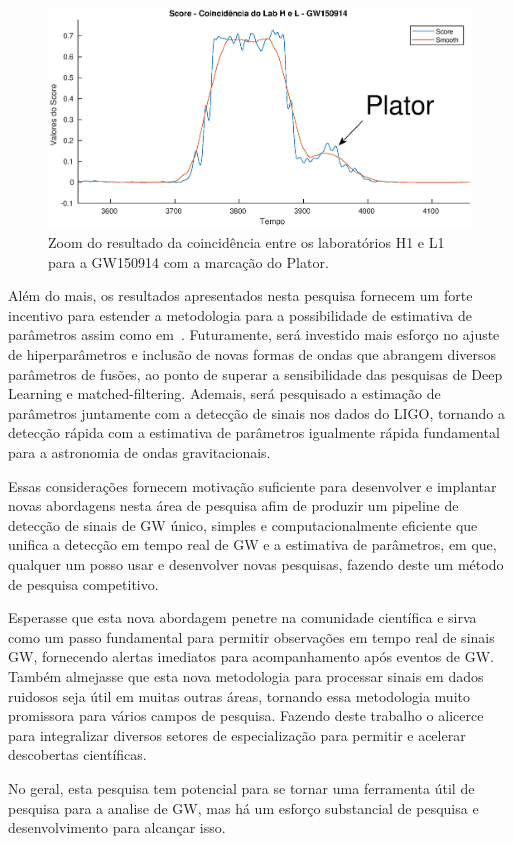 \begin{figure}[H]
\centering
\includegraphics[width=1\textwidth]{figuras/GW150914_LabHL_plator.eps}
\caption{Zoom do resultado da coincidência entre os laboratórios H1 e L1 para a GW150914 com a marcação do Plator.}
\label{fig:scoreHLPlator}
\end{figure}

Além do mais, os resultados apresentados nesta pesquisa fornecem um forte incentivo para estender a metodologia para a possibilidade de estimativa de parâmetros assim como em~\cite{PhysRevD.97.044039,GEORGE201864}. Futuramente, será investido mais esforço no ajuste de hiperparâmetros e inclusão de novas formas de ondas que abrangem diversos parâmetros de fusões, ao ponto de superar a sensibilidade das pesquisas de Deep Learning e matched-filtering. Ademais, será pesquisado a estimação de parâmetros juntamente com a detecção de sinais nos dados do LIGO, tornando a detecção rápida com a estimativa de parâmetros igualmente rápida fundamental para a astronomia de ondas gravitacionais.

Essas considerações fornecem motivação suficiente para desenvolver e implantar novas abordagens nesta área de pesquisa afim de produzir um pipeline de detecção de sinais de GW único, simples e computacionalmente eficiente que unifica a detecção em tempo real de GW e a estimativa de parâmetros, em que, qualquer um posso usar e desenvolver novas pesquisas, fazendo deste um método de pesquisa competitivo.

Esperasse que esta nova abordagem penetre na comunidade científica e sirva como um passo fundamental para permitir observações em tempo real de sinais GW, fornecendo alertas imediatos para acompanhamento após eventos de GW. Também almejasse que esta nova metodologia para processar sinais em dados ruidosos seja útil em muitas outras áreas, tornando essa metodologia muito promissora para vários campos de pesquisa. Fazendo deste trabalho o alicerce para integralizar diversos setores de especialização para permitir e acelerar descobertas científicas.

No geral, esta pesquisa tem potencial para se tornar uma ferramenta útil de pesquisa para a analise de GW, mas há um esforço substancial de pesquisa e desenvolvimento para alcançar isso.